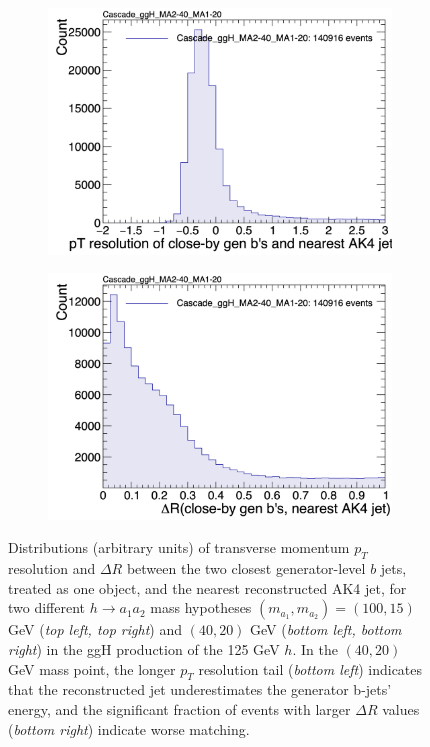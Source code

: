 \begin{figure}[h]
\begin{subfigure}{0.45\textwidth}
        \includegraphics[width=1.0\textwidth]{figures/ch-11-asymmetric/Cascade_ggH_MA2-40_MA1-20_pt_resolution_ak4_leadingPair}
    \end{subfigure}
    \hfill
    \begin{subfigure}{0.45\textwidth}
        \includegraphics[width=1.0\textwidth]{figures/ch-11-asymmetric/Cascade_ggH_MA2-40_MA1-20_deltaR_ak4_leadingPair}
    \end{subfigure}     
    \caption{Distributions (arbitrary units) of transverse momentum $p_{T}$ resolution and $\Delta R$ between the two closest generator-level $b$ jets, treated as one object, and the nearest reconstructed AK4 jet, for two different $h\rightarrow a_1 a_2$ mass hypotheses $(m_{a_1}, m_{a_2}) = (100, 15)$ GeV (\textit{top left, top right}) and $(40, 20)$ GeV (\textit{bottom left, bottom right}) in the ggH production of the 125 GeV $h$. In the $(40, 20)$ GeV mass point, the longer $p_{T}$ resolution tail (\textit{bottom left}) indicates that the reconstructed jet underestimates the generator b-jets' energy, and the significant fraction of events with larger $\Delta R$ values (\textit{bottom right}) indicate worse matching.}
    \label{fig:cascade_matching_to_AK4_jets}
\end{figure}



